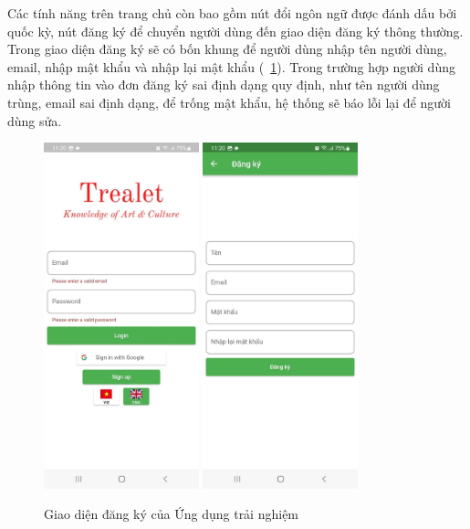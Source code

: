 Các tính năng trên trang chủ còn bao gồm nút đổi ngôn ngữ được đánh dấu
bởi quốc kỳ, nút đăng ký để chuyển người dùng đến giao diện đăng ký thông thường.
Trong giao diện đăng ký sẽ có bốn khung để người dùng nhập tên người dùng, email,
nhập mật khẩu và nhập lại mật khẩu (\figurename~\ref{fig:player-register}). Trong trường hợp người dùng nhập thông tin vào đơn đăng ký sai định dạng
quy định, như tên người dùng trùng, email sai định dạng, để trống mật khẩu, hệ thống
sẽ báo lỗi lại để người dùng sửa.
\begin{figure}
    \centering
    \includegraphics[width=0.4\textwidth]{figures/player-register-1.jpg}
    \includegraphics[width=0.4\textwidth]{figures/player-register-2.jpg}
    \caption{Giao diện đăng ký của Ứng dụng trải nghiệm}
    \label{fig:player-register}
\end{figure}

